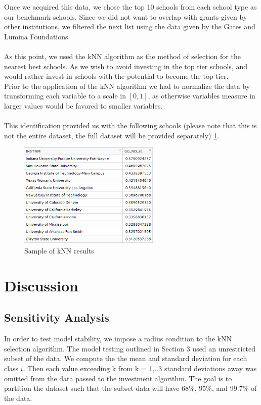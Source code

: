 \documentclass[12pt]{scrartcl}
\begin{document}
	Once we acquired this data, we chose the top 10 schools from each school type as our benchmark schools. Since we did not want to overlap with grants given by other institutions, we filtered the next list using the data given by the Gates\cite{Bill} and Lumina \cite{Grant} Foundations.\\
	\\
	As this point, we used the kNN algorithm as the method of selection for the nearest best schools. As we wish to avoid investing in the top tier schools, and would rather invest in schools with the potential to become the top-tier.\\ 
	Prior to the application of the kNN algorithm we had to normalize the data by transforming each variable to a scale in $[0,1]$, as otherwise variables measure in larger values would be favored to smaller variables.\\
	\\
	This identification provided us with the following schools (please note that this is not the entire dataset, the full dataset will be provided separately) \ref{fig:kNN}.
	\begin{figure}[h]
		\centering
		\includegraphics[width=0.6\textwidth]{6yr-col.png}
		\caption{Sample of kNN results}
		\label{fig:kNN}
	\end{figure}

\section{Discussion} 
\subsection{Sensitivity Analysis}
In order to test model stability, we impose a radius condition to the kNN selection algorithm. The model testing outlined in Section 3 used an unrestricted subset of the data. We compute the the mean and standard deviation for each class $i$. Then each value exceeding k from k = 1,..3 standard deviations away was omitted from the data passed to the investment algorithm. The goal is to partition the dataset such that the subset data will have 68\%, 95\%, and 99.7\% of the data.\\
\end{document}
